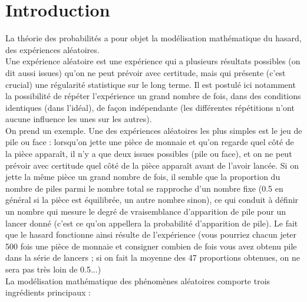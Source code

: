 \documentclass[12pt,a4paper]{report}
\begin{document}
\newcommand{\p}{\mathbb{P}}
\newcommand{\E}{\mathbb{E}}

\section*{Introduction}

La théorie des probabilités a pour objet la modélisation mathématique du hasard, des expériences aléatoires. \\
Une expérience aléatoire est une expérience qui a plusieurs résultats possibles (on dit aussi issues) qu'on ne peut prévoir avec certitude, mais qui présente (c'est 
crucial) une régularité statistique sur le long terme. Il est postulé ici notamment la possibilité de répéter l'expérience un grand nombre de fois, dans des 
conditions identiques (dans l'idéal), de façon indépendante (les différentes répétitions n'ont aucune influence les unes sur les autres). \\
On prend un exemple. Une des expériences aléatoires les plus simples est le jeu de pile ou face : lorsqu'on jette une pièce de monnaie et qu'on regarde quel côté de 
la pièce apparaît, il n'y a que deux issues possibles (pile ou face), et on ne peut prévoir avec certitude quel côté de la pièce apparaît avant de l'avoir lancée. Si 
on jette la même pièce un grand nombre de fois, il semble que la proportion du nombre de piles parmi le nombre total se rapproche d'un nombre fixe (0.5 en général si 
la pièce est équilibrée, un autre nombre sinon), ce qui conduit à définir un nombre qui mesure le degré de vraisemblance d'apparition de pile pour un lancer donné 
(c'est ce qu'on appellera la probabilité d'apparition de pile). Le fait que le hasard fonctionne ainsi résulte de l'expérience (vous pourriez chacun jeter 500 fois 
une pièce de monnaie et consigner combien de fois vous avez obtenu pile dans la série de lancers ; si on fait la moyenne des 47 proportions obtenues, on ne sera pas 
très loin de 0.5...) \\
La modélisation mathématique des phénomènes aléatoires comporte trois ingrédients principaux : 
\end{document}
